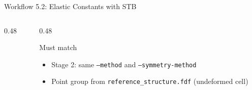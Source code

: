 \documentclass[8pt]{beamer}
\begin{document}
\begin{frame}{Workflow 5.2: Elastic Constants with STB}
\begin{columns}[T]
\begin{column}{0.48\textwidth}
		\end{column}
		\begin{column}{0.48\textwidth}
			\begin{alertblock}{Must match}
				\small
				\begin{itemize}
					\item Stage 2: same \texttt{--method} and \texttt{--symmetry-method}
					\item Point group from \texttt{reference\_structure.fdf} (undeformed cell)
				\end{itemize}
			\end{alertblock}
		\end{column}
	\end{columns}
\end{frame}

\end{document}
